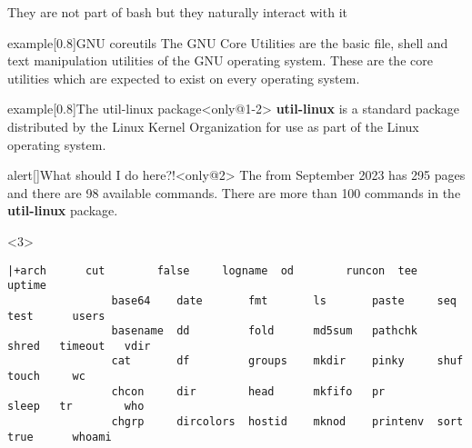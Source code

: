 
\begin{frame}[fragile]{They are not part of bash but they naturally interact with it}
    \vspace{-2mm}
    \begin{varblock}{example}[0.8\textwidth]{GNU coreutils}
        The GNU Core Utilities are the basic file, shell and text manipulation utilities of the GNU operating system.
        These are the core utilities which are expected to exist on every operating system.
    \end{varblock}
    \begin{overlayarea}{\textwidth}{0.6\textheight}
        \begin{varblock}{example}[0.8\textwidth]{The util-linux package}<only@1-2>
            \textbf{util-linux} is a standard package distributed by the Linux Kernel Organization for use as part of the Linux operating system.
        \end{varblock}
        \PrepareURLsymbol[PB]
        \begin{varblock}{alert}[\textwidth]{What should I do here?!}<only@2>
            The  from September 2023 has \alert{295 pages} and there are \alert{98 available commands}.
            There are more than \alert{100 commands} in the \textbf{util-linux} package.
        \end{varblock}
        \begin{onlyenv}<3>
            \begin{lstlisting}[style=myBash, style=smaller, numbers=none, aboveskip=3mm]
                |+arch      cut        false     logname  od        runcon  tee       uptime
                base64    date       fmt       ls       paste     seq     test      users
                basename  dd         fold      md5sum   pathchk   shred   timeout   vdir
                cat       df         groups    mkdir    pinky     shuf    touch     wc
                chcon     dir        head      mkfifo   pr        sleep   tr        who
                chgrp     dircolors  hostid    mknod    printenv  sort    true      whoami

\end{lstlisting}
\end{onlyenv}
\end{overlayarea}
\end{frame}
